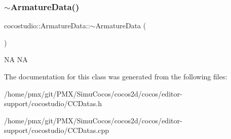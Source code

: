 \subsubsection{\texorpdfstring{$\sim$\+Armature\+Data()}{~ArmatureData()}\hspace{0.1cm}{\footnotesize\ttfamily [2/2]}}
{\footnotesize\ttfamily cocostudio\+::\+Armature\+Data\+::$\sim$\+Armature\+Data (\begin{DoxyParamCaption}{ }\end{DoxyParamCaption})}

NA  NA 

The documentation for this class was generated from the following files\+:\begin{DoxyCompactItemize}
\item 
/home/pmx/git/\+P\+M\+X/\+Simu\+Cocos/cocos2d/cocos/editor-\/support/cocostudio/C\+C\+Datas.\+h\item 
/home/pmx/git/\+P\+M\+X/\+Simu\+Cocos/cocos2d/cocos/editor-\/support/cocostudio/C\+C\+Datas.\+cpp\end{DoxyCompactItemize}
